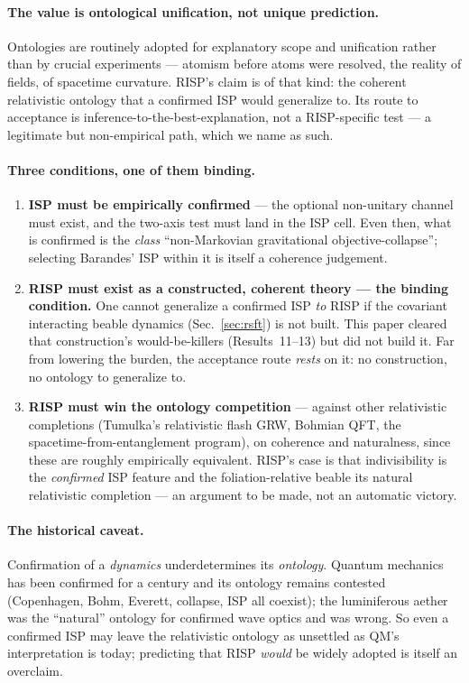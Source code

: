 \documentclass[aps,prd,preprint,amsmath,amssymb,nofootinbib,superscriptaddress]{revtex4-2}
\begin{document}
\paragraph{The value is ontological unification, not unique prediction.} Ontologies are routinely
adopted for explanatory scope and unification rather than by crucial experiments --- atomism before
atoms were resolved, the reality of fields, of spacetime curvature. RISP's claim is of that kind: the
coherent relativistic ontology that a confirmed ISP would generalize to. Its route to acceptance is
inference-to-the-best-explanation, not a RISP-specific test --- a legitimate but non-empirical path,
which we name as such.

\paragraph{Three conditions, one of them binding.}
\begin{enumerate}
\item \textbf{ISP must be empirically confirmed} --- the optional non-unitary channel must exist, and
the two-axis test must land in the ISP cell. Even then, what is confirmed is the \emph{class}
``non-Markovian gravitational objective-collapse''; selecting Barandes' ISP within it is itself a
coherence judgement.
\item \textbf{RISP must exist as a constructed, coherent theory --- the binding condition.} One cannot
generalize a confirmed ISP \emph{to} RISP if the covariant interacting beable dynamics (Sec.~\ref{sec:rsft})
is not built. This paper cleared that construction's would-be-killers (Results~11--13) but did not build
it. Far from lowering the burden, the acceptance route \emph{rests} on it: no construction, no ontology
to generalize to.
\item \textbf{RISP must win the ontology competition} --- against other relativistic completions
(Tumulka's relativistic flash GRW, Bohmian QFT, the spacetime-from-entanglement program), on coherence
and naturalness, since these are roughly empirically equivalent. RISP's case is that indivisibility is
the \emph{confirmed} ISP feature and the foliation-relative beable its natural relativistic completion ---
an argument to be made, not an automatic victory.
\end{enumerate}

\paragraph{The historical caveat.} Confirmation of a \emph{dynamics} underdetermines its \emph{ontology}.
Quantum mechanics has been confirmed for a century and its ontology remains contested (Copenhagen, Bohm,
Everett, collapse, ISP all coexist); the luminiferous aether was the ``natural'' ontology for confirmed
wave optics and was wrong. So even a confirmed ISP may leave the relativistic ontology as unsettled as
QM's interpretation is today; predicting that RISP \emph{would} be widely adopted is itself an overclaim.
\end{document}
